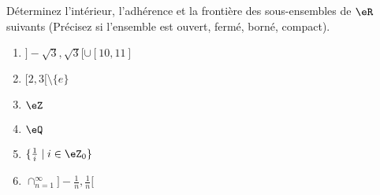 
\begin{exercice}\label{exo0072}

Déterminez l'intérieur, l'adhérence et la frontière des sous-ensembles de $\eR$ suivants (Précisez si l'ensemble est ouvert, fermé, borné, compact).
\begin{enumerate}
\item $ ]  -\sqrt{3}, \sqrt{3} [ \cup [10, 11] $
\item\label{Item72b} $ [ 2, 3[ \setminus \{ e \} $
\item $ \eZ $
\item $ \eQ $
\item $ \{ \frac{1}{i} \mid i \in \eZ_0 \} $
\item\label{ItemF0072} $ \cap_{n = 1}^{ \infty} ] -\frac{1}{n} , \frac{1}{n} [ $
\end{enumerate}

\end{exercice}

